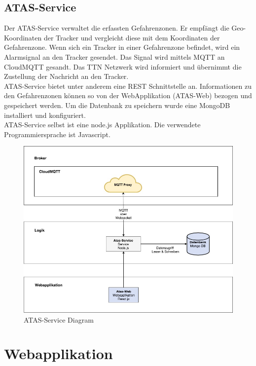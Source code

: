 \documentclass[11pt,english,german]{report}
\theoremstyle{definition}
\begin{document}
\subsection{ATAS-Service}
Der ATAS-Service verwaltet die erfassten Gefahrenzonen. Er empfängt die Geo-Koordinaten der Tracker und vergleicht diese mit dem Koordinaten der Gefahrenzone. Wenn sich ein Tracker in einer Gefahrenzone befindet, wird ein Alarmsignal an den Tracker gesendet. Das Signal wird mittels MQTT an CloudMQTT gesandt. Das TTN Netzwerk wird informiert und übernimmt die Zustellung der Nachricht an den Tracker.\\[0.3cm]
ATAS-Service bietet unter anderem eine REST Schnittstelle an. Informationen zu den Gefahrenzonen können so von der WebApplikation (ATAS-Web) bezogen und gespeichert werden. Um die Datenbank zu speichern wurde eine MongoDB installiert und konfiguriert.\\[0.3cm]
ATAS-Service selbst ist eine node.js Applikation. Die verwendete Programmiersprache ist Javascript.
\begin{figure}[H]
	\centering
	\includegraphics[width=\textwidth]{img/system/ATAS_SystemOverview_ATASService.jpg}
	\caption[ATAS-Service Diagram]
	{ATAS-Service Diagram}
\end{figure}
\newpage

\section{Webapplikation}
\end{document}

